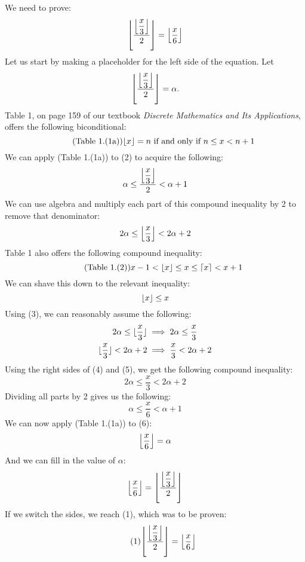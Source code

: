 \documentclass{article}
\DeclarePairedDelimiter{\floor}{\lfloor}{\rfloor}
\DeclarePairedDelimiter{\ceil}{\lceil}{\rceil}
\begin{document}
\section{}
We need to prove:
\begin{equation} 
    \floor*{ \frac{\floor*{\dfrac{x}{3}}}{2} } = \floor*{ \frac{x}{6} }
\end{equation}
Let us start by making a placeholder for the left side of the equation. Let
\begin{equation} 
    \floor*{ \frac{\floor*{\dfrac{x}{3}}}{2} } = \alpha.
\end{equation}
Table 1, on page 159 of our textbook \emph{Discrete Mathematics and Its 
Applications}, offers the following biconditional:
\begin{equation} \tag{Table 1.(1a)}
    \floor{x} = n \text{ if and only if } n \leq x < n+1
\end{equation}
We can apply (Table 1.(1a)) to (2) to acquire the following:
\begin{equation*}
    \alpha \leq \frac{\floor*{\dfrac{x}{3}}}{2} < \alpha + 1
\end{equation*}
We can use algebra and multiply each part of this compound inequality by 2 to
remove that denominator:
\begin{equation*}
    2\alpha \leq \floor*{\dfrac{x}{3}} < 2\alpha + 2
\end{equation*}
Table 1 also offers the following compound inequality:
\begin{equation*} \tag{Table 1.(2)}
    x-1 < \floor{x} \leq x \leq \ceil{x} < x+1
\end{equation*}
We can shave this down to the relevant inequality:
\begin{equation}
    \floor{x} \leq x
\end{equation}
Using (3), we can reasonably assume the following:
\begin{gather}
    2 \alpha \leq \floor{\dfrac{x}{3}} \implies 2 \alpha \leq \dfrac{x}{3} \\
    \floor{\dfrac{x}{3}} < 2\alpha +2 \implies \dfrac{x}{3} < 2\alpha + 2
\end{gather}
Using the right sides of (4) and (5), we get the following compound inequality:
\begin{equation*}
    2 \alpha \leq \dfrac{x}{3} < 2\alpha + 2
\end{equation*}
Dividing all parts by 2 gives us the following:
\begin{equation}
    \alpha \leq \dfrac{x}{6} < \alpha + 1
\end{equation}
We can now apply (Table 1.(1a)) to (6):
\begin{equation*}
    \floor*{\dfrac{x}{6}} = \alpha
\end{equation*}
And we can fill in the value of $\alpha$:
\begin{equation*}
    \floor*{\dfrac{x}{6}} = \floor*{ \frac{\floor*{\dfrac{x}{3}}}{2} }
\end{equation*}
If we switch the sides, we reach (1), which was to be proven:
\begin{equation} \tag{1}
    \floor*{ \frac{\floor*{\dfrac{x}{3}}}{2} } = \floor*{ \frac{x}{6} }
\end{equation}
\end{document}
